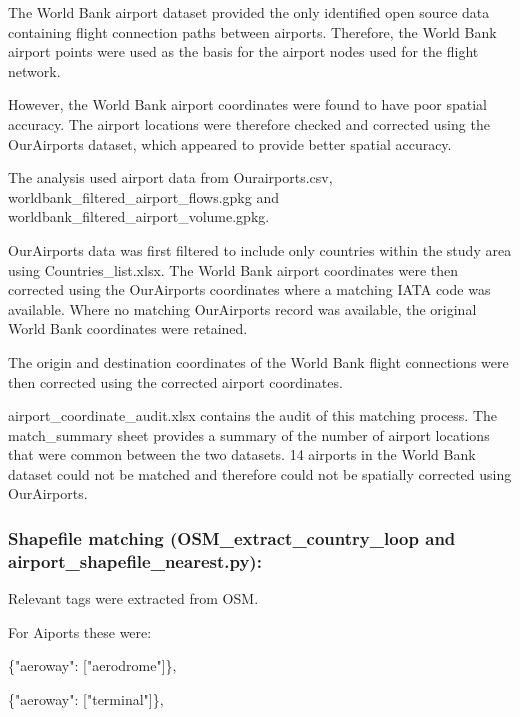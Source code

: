 \documentclass[11pt,a4paper]{article}
\begin{document}
The World Bank airport dataset provided the only identified open source data containing flight connection paths between airports. Therefore, the World Bank airport points were used as the basis for the airport nodes used for the flight network.\par

However, the World Bank airport coordinates were found to have poor spatial accuracy. The airport locations were therefore checked and corrected using the OurAirports dataset, which appeared to provide better spatial accuracy.\par

The analysis used airport data from Ourairports.csv, worldbank\_filtered\_airport\_flows.gpkg and worldbank\_filtered\_airport\_volume.gpkg.\par

OurAirports data was first filtered to include only countries within the study area using Countries\_list.xlsx. The World Bank airport coordinates were then corrected using the OurAirports coordinates where a matching IATA code was available. Where no matching OurAirports record was available, the original World Bank coordinates were retained.\par

The origin and destination coordinates of the World Bank flight connections were then corrected using the corrected airport coordinates.\par

airport\_coordinate\_audit.xlsx contains the audit of this matching process. The match\_summary sheet provides a summary of the number of airport locations that were common between the two datasets. 14 airports in the World Bank dataset could not be matched and therefore could not be spatially corrected using OurAirports.\par

\subsubsection{Shapefile matching (OSM\_extract\_country\_loop and airport\_shapefile\_nearest.py):}

Relevant tags were extracted from OSM.\par

For Aiports these were:\par

\{"aeroway": ["aerodrome"]\},\par

\{"aeroway": ["terminal"]\},\par
\end{document}

